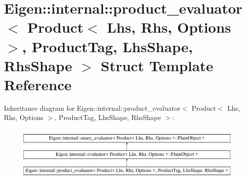 \hypertarget{struct_eigen_1_1internal_1_1product__evaluator_3_01_product_3_01_lhs_00_01_rhs_00_01_options_01_34fdf849c0cc96fc7f8fe25f34362e65}{}\section{Eigen\+::internal\+::product\+\_\+evaluator$<$ Product$<$ Lhs, Rhs, Options $>$, Product\+Tag, Lhs\+Shape, Rhs\+Shape $>$ Struct Template Reference}
\label{struct_eigen_1_1internal_1_1product__evaluator_3_01_product_3_01_lhs_00_01_rhs_00_01_options_01_34fdf849c0cc96fc7f8fe25f34362e65}
Inheritance diagram for Eigen\+::internal\+::product\+\_\+evaluator$<$ Product$<$ Lhs, Rhs, Options $>$, Product\+Tag, Lhs\+Shape, Rhs\+Shape $>$\+:\begin{figure}[H]
\begin{center}
\leavevmode
\includegraphics[height=2.763158cm]{struct_eigen_1_1internal_1_1product__evaluator_3_01_product_3_01_lhs_00_01_rhs_00_01_options_01_34fdf849c0cc96fc7f8fe25f34362e65}
\end{center}
\end{figure}
